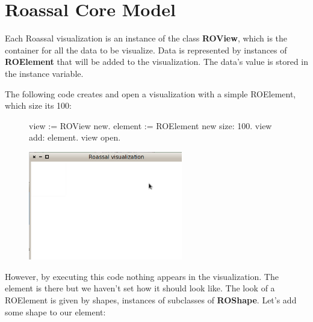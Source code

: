 \documentclass[a4paper,10pt,twoside]{book}
\begin{document}

\section{Roassal Core Model}

Each Roassal visualization is an instance of the class \textbf{ROView}, which is the container for all the data to be visualize.
Data is represented by instances of \textbf{ROElement} that will be added to the visualization. The data's value is stored in the  instance variable.

The following code creates and open a visualization with a simple ROElement, which size its 100:



\begin{figure}[H]
      \begin{minipage}[t]{0.5\textwidth}
      \vspace{0pt}
\begin{code}{}
view := ROView new.
element := 
	ROElement new size: 100.
view add: element.
view open.
\end{code}
   \end{minipage}
   \hfill
   \begin{minipage}[t]{0.6\textwidth}
      \vspace{0pt} \raggedright
       \centering
		\includegraphics[width=0.6\textwidth]{ex1}
   \end{minipage}
\label{fig:ex1}
\end{figure}

However, by executing this code nothing appears in the visualization. The element is there but we haven't set how it should look like. The look of a ROElement is given by shapes, instances of subclasses of \textbf{ROShape}. Let's add some shape to our element:
\end{document}
